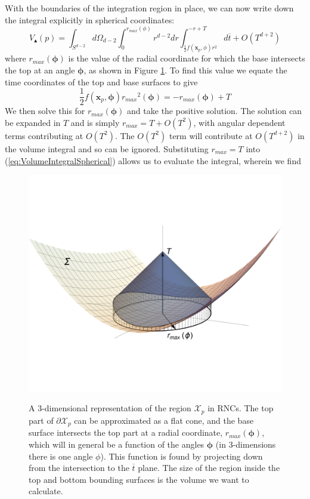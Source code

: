 \documentclass[12pt]{article}
\newcommand{\be}{\begin{equation}}
\newcommand{\ee}{\end{equation}}
\begin{document}
With the boundaries of the integration region in place, we can now write down the integral explicitly in spherical coordinates:
\be\label{eq:VolumeIntegralSpherical}
V_\blacktriangle (p)=\int_{S^{d-2}}
d\Omega_{d-2}
\int_{0}^{r_{max} (\phi)}r^{d-2}dr
\int_{\frac{1}{2}f (\mathbf{x}_p,\phi)r^2}^{-r+T}
d\overline{t}+O (T^{d+2})
\ee
where $r_{max} (\boldsymbol\phi)$ is the value of the radial coordinate for which the base intersects the top at an angle $\boldsymbol\phi$, as shown in Figure \ref{fig:cone_plot}. To find this value we equate the time coordinates of the top and base surfaces to give 
\be
\frac{1}{2}f (\mathbf{x}_p,\boldsymbol\phi){r_{max}}^2 (\boldsymbol\phi)=-r_{max} (\boldsymbol\phi)+T
\ee 
We then solve this for $r_{max} (\boldsymbol\phi)$ and take the positive solution. The solution can be expanded in $T$ and is simply $r_{max}=T+O (T^2)$, with angular dependent terms contributing at $O (T^2)$. The $O (T^2)$ term will contribute at $O (T^{d+2})$ in the volume integral and so can be ignored. Substituting $r_{max}=T$ into (\ref{eq:VolumeIntegralSpherical}) allows us to evaluate the integral, wherein we find 
\begin{figure}[t]
  \centering
    {\includegraphics[scale=0.5,trim={1cm 5cm 1cm 6cm},clip]{coneplot3}}
     \caption{A $3$-dimensional representation of the region $\mathcal{X}_p$ in RNCs. The top part of $\partial\mathcal{X}_p$ can be approximated as a flat cone, and the base surface intersects the top part at a radial coordinate, $r_{max} (\boldsymbol\phi)$, which will in general be a function of the angles $\boldsymbol\phi$ (in $3$-dimensions there is one angle $\phi$). This function is found by projecting down from the intersection to the $\overline{t}$ plane. The size of the region inside the top and bottom bounding surfaces is the volume we want to calculate.}
     \label{fig:cone_plot}
\end{figure}
\end{document}
